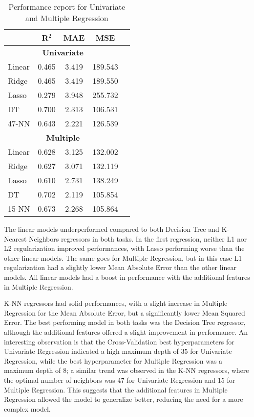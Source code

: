 \begin{table}[H]
    \centering
    \begin{tabular}{lc@{\hskip 30pt}ccc}
        \toprule
         & \textbf{R$^2$} & \textbf{MAE} & \textbf{MSE} \\
        \midrule
        \multicolumn{4}{c}{\textbf{Univariate}} \\
        \midrule
        Linear & 0.465 & 3.419 & 189.543 \\
        Ridge & 0.465 & 3.419 & 189.550 \\
        Lasso & 0.279 & 3.948 & 255.732 \\
        DT & 0.700 & 2.313 & 106.531 \\ %
        47-NN & 0.643 & 2.221 & 126.539 \\ %
        \midrule
        \multicolumn{4}{c}{\textbf{Multiple}} \\
        \midrule
        Linear & 0.628 & 3.125 & 132.002 \\
        Ridge & 0.627 & 3.071 & 132.119 \\ %
        Lasso & 0.610 & 2.731 & 138.249 \\ %
        DT & 0.702 & 2.119 & 105.854 \\ %
        15-NN & 0.673 & 2.268 & 105.864 \\ %
        \bottomrule
    \end{tabular}
    \caption{Performance report for Univariate and Multiple Regression}
    \label{tab:uni_multi_regression_report}
\end{table}
The linear models underperformed compared to both Decision
Tree and K-Nearest Neighbors regressors in both tasks. In the first regression, neither L1 nor L2
regularization improved performances, with Lasso performing worse than the other linear models.
The same goes for Multiple Regression, but in this case L1 regularization had a slightly lower Mean Absolute Error
than the other linear models.
All linear models had a boost in performance with the additional features in Multiple Regression.

K-NN regressors had solid performances, with a slight increase in Multiple Regression for the Mean Absolute Error,
but a significantly lower Mean Squared Error.
The best performing model in both tasks was the Decision Tree regressor, although the additional features
offered a slight improvement in performance. An interesting observation is that the Cross-Validation
best hyperparameters for Univariate Regression indicated a high maximum depth of 35 for Univariate Regression,
while the best hyperparameter for Multiple Regression was a maximum depth of 8; a similar trend was observed
in the K-NN regressors, where the optimal number of neighbors was 47 for Univariate Regression and 15 for Multiple Regression.
This suggests that the additional features in Multiple Regression allowed the model to generalize better,
reducing the need for a more complex model.



